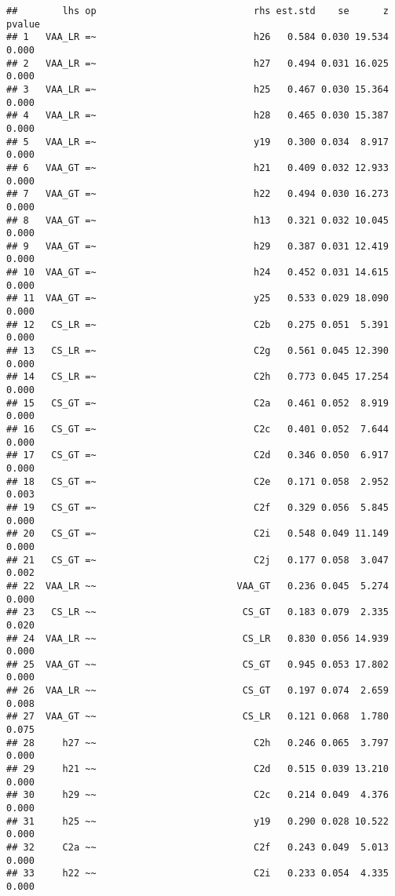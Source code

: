 \documentclass[
]{article}
\begin{document}
\begin{verbatim}
##        lhs op                            rhs est.std    se      z pvalue
## 1   VAA_LR =~                            h26   0.584 0.030 19.534  0.000
## 2   VAA_LR =~                            h27   0.494 0.031 16.025  0.000
## 3   VAA_LR =~                            h25   0.467 0.030 15.364  0.000
## 4   VAA_LR =~                            h28   0.465 0.030 15.387  0.000
## 5   VAA_LR =~                            y19   0.300 0.034  8.917  0.000
## 6   VAA_GT =~                            h21   0.409 0.032 12.933  0.000
## 7   VAA_GT =~                            h22   0.494 0.030 16.273  0.000
## 8   VAA_GT =~                            h13   0.321 0.032 10.045  0.000
## 9   VAA_GT =~                            h29   0.387 0.031 12.419  0.000
## 10  VAA_GT =~                            h24   0.452 0.031 14.615  0.000
## 11  VAA_GT =~                            y25   0.533 0.029 18.090  0.000
## 12   CS_LR =~                            C2b   0.275 0.051  5.391  0.000
## 13   CS_LR =~                            C2g   0.561 0.045 12.390  0.000
## 14   CS_LR =~                            C2h   0.773 0.045 17.254  0.000
## 15   CS_GT =~                            C2a   0.461 0.052  8.919  0.000
## 16   CS_GT =~                            C2c   0.401 0.052  7.644  0.000
## 17   CS_GT =~                            C2d   0.346 0.050  6.917  0.000
## 18   CS_GT =~                            C2e   0.171 0.058  2.952  0.003
## 19   CS_GT =~                            C2f   0.329 0.056  5.845  0.000
## 20   CS_GT =~                            C2i   0.548 0.049 11.149  0.000
## 21   CS_GT =~                            C2j   0.177 0.058  3.047  0.002
## 22  VAA_LR ~~                         VAA_GT   0.236 0.045  5.274  0.000
## 23   CS_LR ~~                          CS_GT   0.183 0.079  2.335  0.020
## 24  VAA_LR ~~                          CS_LR   0.830 0.056 14.939  0.000
## 25  VAA_GT ~~                          CS_GT   0.945 0.053 17.802  0.000
## 26  VAA_LR ~~                          CS_GT   0.197 0.074  2.659  0.008
## 27  VAA_GT ~~                          CS_LR   0.121 0.068  1.780  0.075
## 28     h27 ~~                            C2h   0.246 0.065  3.797  0.000
## 29     h21 ~~                            C2d   0.515 0.039 13.210  0.000
## 30     h29 ~~                            C2c   0.214 0.049  4.376  0.000
## 31     h25 ~~                            y19   0.290 0.028 10.522  0.000
## 32     C2a ~~                            C2f   0.243 0.049  5.013  0.000
## 33     h22 ~~                            C2i   0.233 0.054  4.335  0.000

\end{verbatim}
\end{document}
